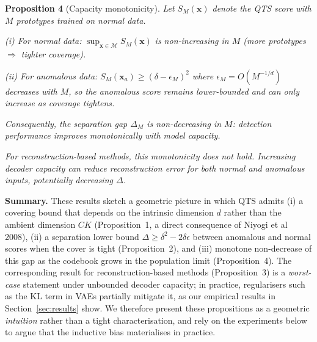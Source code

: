 \documentclass{iopjournal}
\begin{document}
\textbf{Proposition 4} (Capacity monotonicity). \emph{Let $S_M(\mathbf{x})$ denote the QTS score with $M$ prototypes trained on normal data.}

\emph{(i) For normal data:} $\sup_{\mathbf{x} \in \mathcal{M}} S_M(\mathbf{x})$ \emph{is non-increasing in $M$ (more prototypes $\Rightarrow$ tighter coverage).}

\emph{(ii) For anomalous data:} $S_M(\mathbf{x}_a) \geq (\delta - \epsilon_M)^2$ \emph{where $\epsilon_M = O(M^{-1/d})$ decreases with $M$, so the anomalous score remains lower-bounded and can only increase as coverage tightens.}

\emph{Consequently, the separation gap $\Delta_M$ is non-decreasing in $M$: detection performance improves monotonically with model capacity.}

\emph{For reconstruction-based methods, this monotonicity does not hold. Increasing decoder capacity can reduce reconstruction error for both normal and anomalous inputs, potentially decreasing $\Delta$.}

\textbf{Summary.} These results sketch a geometric picture in which QTS admits (i) a covering bound that depends on the intrinsic dimension $d$ rather than the ambient dimension $CK$ (Proposition~1, a direct consequence of Niyogi et al 2008), (ii) a separation lower bound $\Delta \geq \delta^2 - 2\delta\epsilon$ between anomalous and normal scores when the cover is tight (Proposition~2), and (iii) monotone non-decrease of this gap as the codebook grows in the population limit (Proposition~4). The corresponding result for reconstruction-based methods (Proposition~3) is a \emph{worst-case} statement under unbounded decoder capacity; in practice, regularisers such as the KL term in VAEs partially mitigate it, as our empirical results in Section~\ref{sec:results} show. We therefore present these propositions as a geometric \emph{intuition} rather than a tight characterisation,  and rely on the experiments below to argue that the inductive bias materialises in practice.
\end{document}
